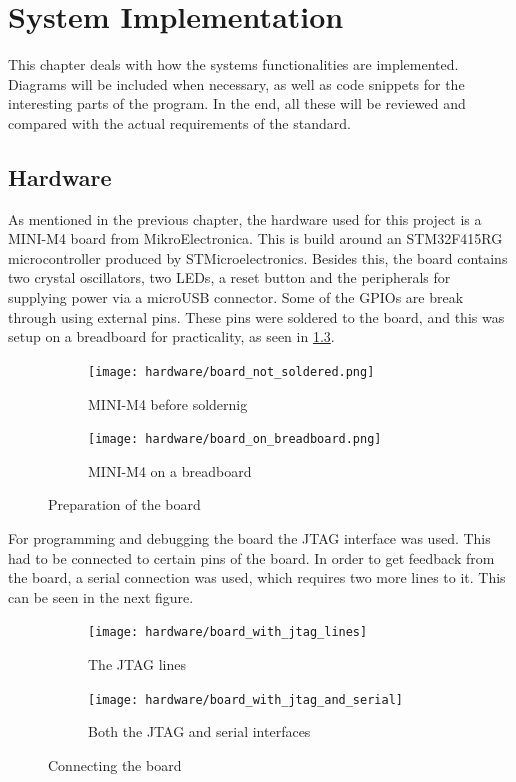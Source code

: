 
\newcommand{\excreturn}{EXC\_RETURN}

\chapter{System Implementation}
This chapter deals with how the system\textquotesingle s functionalities 
are implemented. Diagrams will be included when necessary, as well as code 
snippets for the interesting parts of the program. In the end, all these
will be reviewed and compared with the actual requirements of the standard.


\section{Hardware}

As mentioned in the previous chapter, the hardware used for this project 
is a MINI-M4 board from MikroElectronica. This is build around an
STM32F415RG microcontroller produced by STMicroelectronics. Besides
this, the board contains two crystal oscillators, two LEDs, a reset 
button and the peripherals for supplying power via a microUSB connector.
Some of the GPIOs are break through using external pins.
These pins were soldered to the board, and this was setup on a breadboard
for practicality, as seen in \ref{fig:photo1}.

\begin{figure}[H]
\begin{subfigure}{0.5\textwidth}
  \centering
  \texttt{[image: hardware/board\_not\_soldered.png]}
  \caption{MINI-M4 before soldernig}
  \label{fig:sub1}
\end{subfigure}%
\begin{subfigure}{0.5\textwidth}
  \centering
  \texttt{[image: hardware/board\_on\_breadboard.png]}
  \caption{MINI-M4 on a breadboard}
  \label{fig:sub2}
\end{subfigure}
\caption{Preparation of the board}
\label{fig:photo1}
\end{figure}

For programming and debugging the board the JTAG interface was used.
This had to be connected to certain pins of the board. In order to get 
feedback from the board, a serial connection was used, which requires two
more lines to it. This can be seen in the next figure.

\begin{figure}[H]
\centering
\begin{subfigure}{.5\textwidth}
  \centering
  \texttt{[image: hardware/board\_with\_jtag\_lines]}
  \caption{The JTAG lines}
  \label{fig:sub1}
\end{subfigure}%
\begin{subfigure}{.5\textwidth}
  \centering
  \texttt{[image: hardware/board\_with\_jtag\_and\_serial]}
  \caption{Both the JTAG and serial interfaces}
  \label{fig:sub2}
\end{subfigure}
\caption{Connecting the board}
\label{fig:photo2}
\end{figure}

